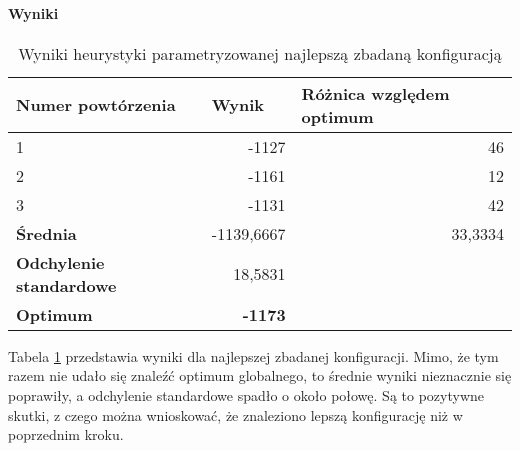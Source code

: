 \documentclass[./FM_mgr.tex]{subfiles}
\begin{document}
\paragraph{Wyniki}

\begin{table}[h]
	\caption{Wyniki heurystyki parametryzowanej najlepszą zbadaną konfiguracją \label{knapsack_tweak_results}}
	\centering
	\begin{tabular}{|l|r|r}
		\hline
		{\bf Numer powtórzenia}      & \multicolumn{1}{l|}{{\bf Wynik}} & \multicolumn{1}{l|}{{\bf Różnica względem optimum}} \\ \hline \hline
		1                                             & -1127                            & \multicolumn{1}{r|}{46}                             \\ \hline
		2                                             & -1161                            & \multicolumn{1}{r|}{12}                             \\ \hline
		3                                             & -1131                            & \multicolumn{1}{r|}{42}                             \\ \hline \hline
		{\bf Średnia}                                 & -1139,6667                       & \multicolumn{1}{r|}{33,3334}                        \\ \hline
		{\bf Odchylenie standardowe}                  & 18,5831                          &                                                     \\ \hhline{==~}
		{\bf Optimum}                                 & {\bf -1173}                      &                                                     \\ \cline{1-2}
	\end{tabular}
\end{table}

Tabela \ref{knapsack_tweak_results} przedstawia wyniki dla najlepszej zbadanej konfiguracji.
Mimo, że tym razem nie udało się znaleźć optimum globalnego, to średnie wyniki nieznacznie się poprawiły, a odchylenie standardowe spadło o około połowę.
Są to pozytywne skutki, z czego można wnioskować, że znaleziono lepszą konfigurację niż w poprzednim kroku.
\end{document}
